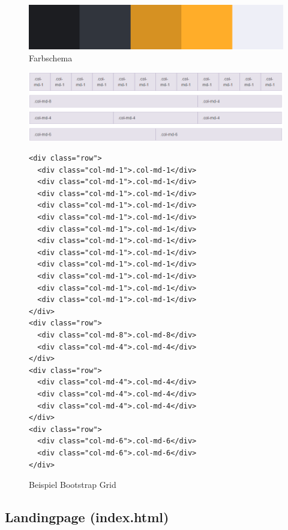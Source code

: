 \begin{figure}
	\centering
	\includegraphics[scale=0.32]{img/Capture.PNG}
	\captionsetup{format=hang}
	\caption[Farbschema]{\label{fig:Color}Farbschema}
\end{figure}
\begin{figure}
	\centering
	\includegraphics[scale=0.7]{img/Capture2.PNG}
	\captionsetup{format=hang}
	\caption[Beispiel Bootstrap Grid]{\label{fig:Grid}Beispiel Bootstrap Grid \cite{B}}

	\begin{lstlisting}[caption={Code für Abbuildung \ref{fig:Grid} \cite{B}}, label={lst:Database Query Core Node}]
<div class="row">
  <div class="col-md-1">.col-md-1</div>
  <div class="col-md-1">.col-md-1</div>
  <div class="col-md-1">.col-md-1</div>
  <div class="col-md-1">.col-md-1</div>
  <div class="col-md-1">.col-md-1</div>
  <div class="col-md-1">.col-md-1</div>
  <div class="col-md-1">.col-md-1</div>
  <div class="col-md-1">.col-md-1</div>
  <div class="col-md-1">.col-md-1</div>
  <div class="col-md-1">.col-md-1</div>
  <div class="col-md-1">.col-md-1</div>
  <div class="col-md-1">.col-md-1</div>
</div>
<div class="row">
  <div class="col-md-8">.col-md-8</div>
  <div class="col-md-4">.col-md-4</div>
</div>
<div class="row">
  <div class="col-md-4">.col-md-4</div>
  <div class="col-md-4">.col-md-4</div>
  <div class="col-md-4">.col-md-4</div>
</div>
<div class="row">
  <div class="col-md-6">.col-md-6</div>
  <div class="col-md-6">.col-md-6</div>
</div>
\end{lstlisting}
\end{figure}

\subsection{Landingpage (index.html)}

